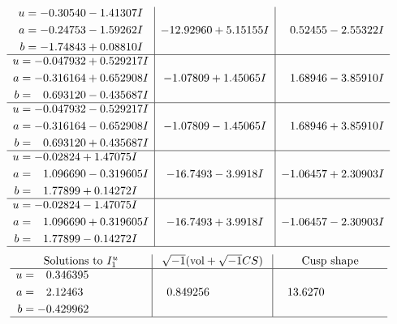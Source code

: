 \documentclass[1p]{elsarticle_modified}
\theoremstyle{definition}
\newcommand{\I}{\sqrt{-1}}
\begin{document}
$$\begin{array}{c|c|c}
\begin{aligned}
u &= -0.30540 - 1.41307 I \\
a &= -0.24753 - 1.59262 I \\
b &= -1.74843 + 0.08810 I\end{aligned}
 & -12.92960 + 5.15155 I & \phantom{-}0.52455 - 2.55322 I \\ \hline\begin{aligned}
u &= -0.047932 + 0.529217 I \\
a &= -0.316164 + 0.652908 I \\
b &= \phantom{-}0.693120 - 0.435687 I\end{aligned}
 & -1.07809 + 1.45065 I & \phantom{-}1.68946 - 3.85910 I \\ \hline\begin{aligned}
u &= -0.047932 - 0.529217 I \\
a &= -0.316164 - 0.652908 I \\
b &= \phantom{-}0.693120 + 0.435687 I\end{aligned}
 & -1.07809 - 1.45065 I & \phantom{-}1.68946 + 3.85910 I \\ \hline\begin{aligned}
u &= -0.02824 + 1.47075 I \\
a &= \phantom{-}1.096690 - 0.319605 I \\
b &= \phantom{-}1.77899 + 0.14272 I\end{aligned}
 & -16.7493 - 3.9918 I & -1.06457 + 2.30903 I \\ \hline\begin{aligned}
u &= -0.02824 - 1.47075 I \\
a &= \phantom{-}1.096690 + 0.319605 I \\
b &= \phantom{-}1.77899 - 0.14272 I\end{aligned}
 & -16.7493 + 3.9918 I & -1.06457 - 2.30903 I\\
 \hline 
 \end{array}$$\newpage$$\begin{array}{c|c|c}  
\text{Solutions to }I^u_{1}& \I (\text{vol} + \sqrt{-1}CS) & \text{Cusp shape}\\
 \hline 
\begin{aligned}
u &= \phantom{-}0.346395\phantom{ +0.000000I} \\
a &= \phantom{-}2.12463\phantom{ +0.000000I} \\
b &= -0.429962\phantom{ +0.000000I}\end{aligned}
 & \phantom{-}0.849256\phantom{ +0.000000I} & \phantom{-}13.6270\phantom{ +0.000000I}\\
 \hline 
 \end{array}$$\newpage\newpage\renewcommand{\arraystretch}{1}
\end{document}
